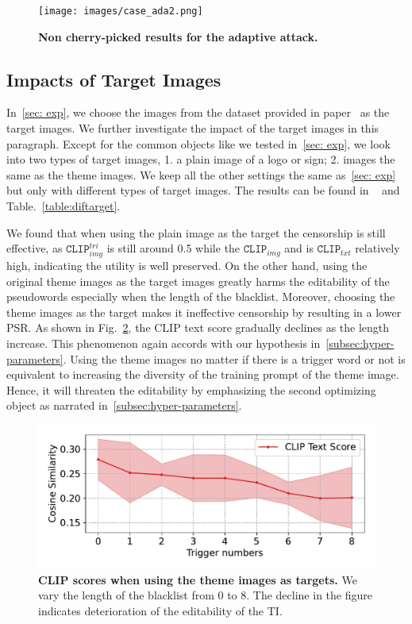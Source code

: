 \begin{figure}[htp]
    \centering 
    \texttt{[image: images/case\_ada2.png]}
    \caption{\textbf{Non cherry-picked results for the adaptive attack.}}
    \label{fig:adapt}
\end{figure}

\subsection{Impacts of Target Images}
In~\cref{sec: exp}, we choose the images from the dataset provided in paper~\cite{textual_inversion} as the target images. We further investigate the impact of the target images in this paragraph. Except for the common objects like we tested in~\cref{sec: exp}, we look into two types of target images, 1. a plain image of a logo or sign; 2. images the same as the theme images. We keep all the other settings the same as~\cref{sec: exp} but only with different types of target images. The results can be found in ~ and Table.~\ref{table:diftarget}.

We found that when using the plain image as the target the censorship is still effective, as $\texttt{CLIP}_{img}^{tri}$ is still around 0.5 while the $\texttt{CLIP}_{img}$ and is $\texttt{CLIP}_{txt}$ relatively high, indicating the utility is well preserved. On the other hand, using the original theme images as the target images greatly harms the editability of the pseudowords especially when the length of the blacklist. Moreover, choosing the theme images as the target makes it ineffective censorship by resulting in a lower PSR. As shown in Fig.~\ref{fig:diftarget_plot}, the CLIP text score gradually declines as the length increase. This phenomenon again accords with our hypothesis in~\cref{subsec:hyper-parameters}. Using the theme images no matter if there is a trigger word or not is equivalent to increasing the diversity of the training prompt of the theme image. Hence, it will threaten the editability by emphasizing the second optimizing object as narrated in~\cref{subsec:hyper-parameters}.

\begin{figure}
    \centering 
    \includegraphics[width=\linewidth]{images/Themetarget_triggers.pdf}
    \caption{\textbf{CLIP scores when using the theme images as targets.} We vary the length of the blacklist from 0 to 8. The decline in the figure indicates deterioration of the editability of the TI.}
    \label{fig:diftarget_plot}
\end{figure}

